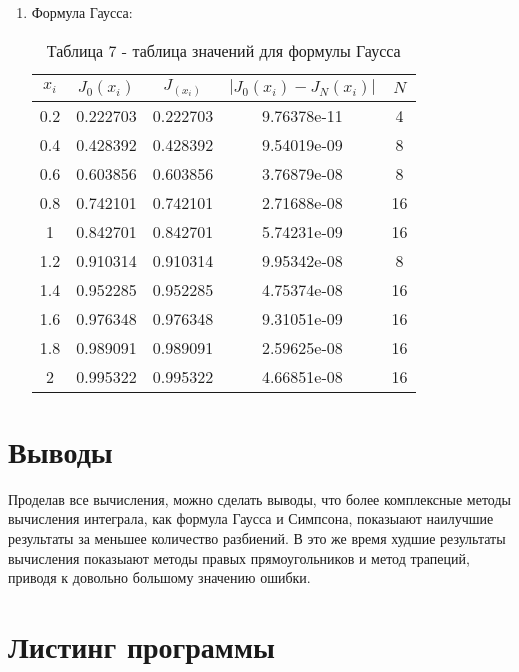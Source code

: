 \documentclass[a4paper,12pt]{article}
\begin{document}
{\begin{enumerate}[label = \arabic*.]
    \item {Формула Гаусса:
        \begin{table}[h]
          \centering
          \begin{tabular}{|c|c|c|c|c|}
            \hline
            $x_i$ & $J_0(x_i)$ & $J_(x_i)$ & $\left|J_0(x_i) - J_N(x_i)\right|$ & $N$\\
            \hline
            0.2 &  0.222703 &  0.222703 & 9.76378e-11 & 4\\
            \hline
            0.4 &  0.428392 &  0.428392 & 9.54019e-09 & 8\\
            \hline
            0.6 &  0.603856 &  0.603856 & 3.76879e-08 & 8\\
            \hline
            0.8 &  0.742101 &  0.742101 & 2.71688e-08 & 16\\
            \hline
            1 &  0.842701 &  0.842701 & 5.74231e-09 & 16\\
            \hline
            1.2 &  0.910314 &  0.910314 & 9.95342e-08 & 8\\
            \hline
            1.4 &  0.952285 &  0.952285 & 4.75374e-08 & 16\\
            \hline
            1.6 &  0.976348 &  0.976348 & 9.31051e-09 & 16\\
            \hline
            1.8 &  0.989091 &  0.989091 & 2.59625e-08 & 16\\
            \hline
            2 &  0.995322 &  0.995322 & 4.66851e-08 & 16\\
            \hline
          \end{tabular}
          \caption*{\small{Таблица 7 - таблица значений для формулы Гаусса}}
        \end{table}
    }
\end{enumerate}
\section{Выводы}
\hspace{1.25cm}Проделав все вычисления, можно сделать выводы, что более комплексные методы вычисления интеграла, как формула Гаусса и Симпсона, показыают наилучшие результа\-ты за меньшее количество разбиений. В это же время худшие результаты вычисления показыают методы правых прямоугольников и метод трапеций, приводя к довольно большому значению ошибки.}
\newpage
\section{Листинг программы}



\end{document}
